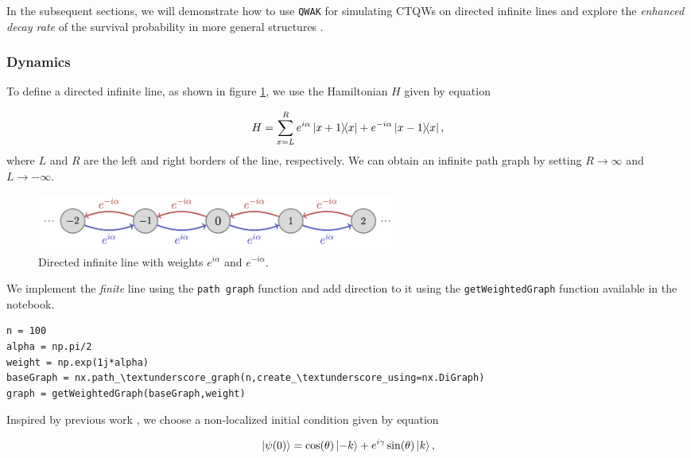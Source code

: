 \documentclass[../../main.tex]{subfiles}
\begin{document}
In the subsequent sections, we will demonstrate how to use \texttt{QWAK} for
simulating CTQWs on directed infinite lines and explore the \textit{enhanced
decay rate} of the survival probability \cite{abalEffects06} in more general
structures \cite{Chaves2023}.

\subsubsection{Dynamics}

To define a directed infinite line, as shown in figure \ref{fig:oriented_line},
we use the Hamiltonian $H$ given by equation 

\begin{equation}\label{hamiltonian}
    H = \sum_{x = L}^{R}e^{i\alpha}\ketbra{x+1}{x}+e^{-i\alpha}\ketbra{x-1}{x},
\end{equation}
where $L$ and $R$ are the left and right borders of
the line, respectively. We can obtain an infinite path graph by setting
$R\rightarrow\infty$ and $L\rightarrow -\infty$. 

\begin{figure}[!h]
    \centering
    \includegraphics[width=12cm]{img/QWAK/oriented_infinite_line.png}
    \caption{Directed infinite line with weights $e^{i\alpha}$ and $e^{-i\alpha}$.}
    \label{fig:oriented_line}
\end{figure}

We implement the \textit{finite} line using the \texttt{path\textunderscore
graph} function and add direction to it using the \texttt{getWeightedGraph}
function available in the notebook.

\begin{lstlisting}[style=code,escapeinside={__}]
n = 100
alpha = np.pi/2
weight = np.exp(1j*alpha)
baseGraph = nx.path_\textunderscore_graph(n,create_\textunderscore_using=nx.DiGraph)
graph = getWeightedGraph(baseGraph,weight)
\end{lstlisting}

Inspired by previous work \cite{abalEffects06}, we choose a non-localized
initial condition given by equation

\begin{equation}
    \label{eq:survProbInitCond}
    \ket{\psi(0)} = \cos(\theta)\ket{-k} + e^{i\gamma}\sin(\theta)\ket{k},
\end{equation}
\end{document}
